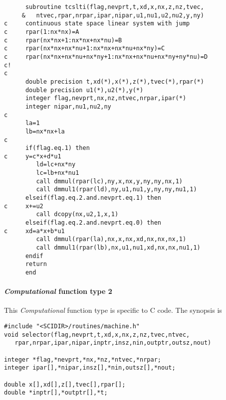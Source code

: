 \documentclass{book}
\newcommand{\computational}{{\em Computational }}
\begin{document}
\begin{verbatim}
      subroutine tcslti(flag,nevprt,t,xd,x,nx,z,nz,tvec,
     &   ntvec,rpar,nrpar,ipar,nipar,u1,nu1,u2,nu2,y,ny)
c     continuous state space linear system with jump
c     rpar(1:nx*nx)=A
c     rpar(nx*nx+1:nx*nx+nx*nu)=B
c     rpar(nx*nx+nx*nu+1:nx*nx+nx*nu+nx*ny)=C
c     rpar(nx*nx+nx*nu+nx*ny+1:nx*nx+nx*nu+nx*ny+ny*nu)=D
c!
c
      double precision t,xd(*),x(*),z(*),tvec(*),rpar(*)
      double precision u1(*),u2(*),y(*)
      integer flag,nevprt,nx,nz,ntvec,nrpar,ipar(*)
      integer nipar,nu1,nu2,ny
c
      la=1
      lb=nx*nx+la
c
      if(flag.eq.1) then
c     y=c*x+d*u1     
         ld=lc+nx*ny
         lc=lb+nx*nu1
         call dmmul(rpar(lc),ny,x,nx,y,ny,ny,nx,1)
         call dmmul1(rpar(ld),ny,u1,nu1,y,ny,ny,nu1,1)
      elseif(flag.eq.2.and.nevprt.eq.1) then
c     x+=u2
         call dcopy(nx,u2,1,x,1)
      elseif(flag.eq.2.and.nevprt.eq.0) then
c     xd=a*x+b*u1
         call dmmul(rpar(la),nx,x,nx,xd,nx,nx,nx,1)
         call dmmul1(rpar(lb),nx,u1,nu1,xd,nx,nx,nu1,1)
      endif
      return
      end
\end{verbatim}

\paragraph{\computational function type 2}
This \computational function type is specific to C code. The synopsis
is

\begin{verbatim}
#include "<SCIDIR>/routines/machine.h"
void selector(flag,nevprt,t,xd,x,nx,z,nz,tvec,ntvec,
   rpar,nrpar,ipar,nipar,inptr,insz,nin,outptr,outsz,nout)

integer *flag,*nevprt,*nx,*nz,*ntvec,*nrpar;
integer ipar[],*nipar,insz[],*nin,outsz[],*nout;

double x[],xd[],z[],tvec[],rpar[];
double *inptr[],*outptr[],*t;
\end{verbatim}
\end{document}
